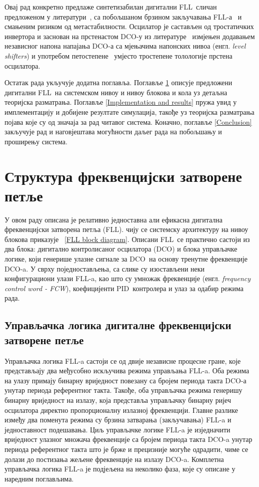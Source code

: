 \documentclass[master]{finthesis}
\def \FLL {FLL} %
\def \DCO {DCO} %
\def \PID {PID} %
\begin{document}
Овај рад конкретно предлаже синтетизабилан дигитални \FLL\ сличан предложеном у литератури~\cite{Musa:6644316}, са побољшаном брзином закључавања \FLL-а~\cite{Deng:6891375} и смањеним ризиком од метастабилности. Осцилатор је састављен од тростатичких инвертора и заснован на прстенастом \DCO-у из литературе~\cite{Tierno:4443210} измјењен додавањем независног напона напајања \DCO-а са мјењачима напонских нивоа (енгл. \textit{level shifters}) и употребом петостепене~\cite{Rylyakov:4523284} умјесто тростепене толологије прстена осцилатора.

Остатак рада укључује додатна поглавља. Поглавље \ref{FLL structure} описује предложени дигитални \FLL\ на системском нивоу и нивоу блокова и кола уз детаљна теоријска разматрања. Поглавље \ref{Implementation and results} пружа увид у имплементацију и добијене резултате симулација, такође уз теоријска разматрања појава које су од значаја за рад читавог система. Коначно, поглавље \ref{Conclusion} закључује рад и наговјештава могућности даљег рада на побољшању и проширењу система.


\section{Структура фреквенцијски затворене петље} \label{FLL structure}


У овом раду описана је релативно једноставна али ефикасна дигитална фреквенцијски затворена петља (\FLL). чију се системску архитектуру на нивоу блокова приказује \figurename~\ref{FLL block diagram}. Описани \FLL\ се практично састоји из два блока: дигитално контролисаног осцилатора (\DCO) и блока управљачке логике, који генерише улазне сигнале за \DCO\ на основу тренутне фреквенције \DCO-a. У сврху поједностављења, са слике су изостављени неки конфигурациони улази \FLL-a, као што су умножак фреквенције (енгл. \textit{frequency control word - FCW}), коефицијенти \PID\ контролера и улаз за одабир режима рада. 



\subsection{Управљачка логика дигиталне фреквенцијски затворене петље}
Управљачка логика \FLL-a састоји се од двије независне процесне гране, које представљају два међусобно искључива режима управљања \FLL-a. Оба режима на улазу примају бинарну вриједност повезану са бројем периода такта \DCO-а унутар периода референтног такта. Такође, оба управљачка режима генеришу бинарну вриједност на излазу, која представља управљачку бинарну ријеч осцилатора директно пропорционалну излазној фреквенцији. Главне разлике између два поменута режима су брзина затварања (закључавања) \FLL-a и једноставност подешавања. Циљ управљачке логике \FLL-a је изједначити вриједност улазног множача фреквенције са бројем периода такта \DCO-a унутар периода референтног такта што је брже и прецизније могуће одрадити, чиме се долази до постизања жељене фреквенције на излазу \DCO-a. Комплетна управљачка логика \FLL-a је подјељена на неколико фаза, које су описане у наредним поглављима.
\end{document}
